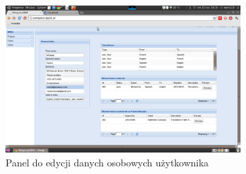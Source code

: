 \documentclass[licencjacka]{pracamgr}
\begin{document}
\begin{figure}[ht!]
\centering
\includegraphics[width=0.8\textwidth]{resources/edycja_danych.png}
\caption{Panel do edycji danych osobowych użytkownika}
\end{figure}
\end{document}
